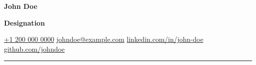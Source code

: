 {

\setlength{\parskip}{\vspaceDefault}

\par {\Huge\bfseries John Doe}
\par {\Large\bfseries Designation}

{


\par%
\href{tel:+12000000000}{+1 200 000 0000}\asterisksep
\href{mailto:johndoe@example.com}{johndoe@example.com}\asterisksep
\href{https://linkedin.com/in/john-doe}{linkedin.com/in/john-doe}\asterisksep
\href{https://github.com/johndoe}{github.com/johndoe}

}
}

\vspace{\vspaceDefault}

\hrule
